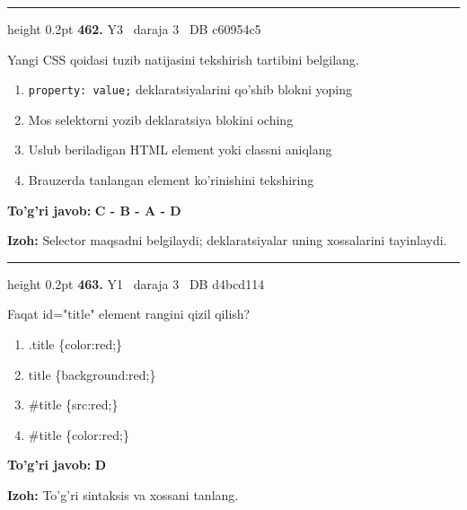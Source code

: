 \documentclass[10pt,a4paper,oneside]{article}
\begin{document}
\vspace{2mm}\hrule height 0.2pt \vspace{4mm}
\hypertarget{q462}{\textbf{\color{ink}462.}}  {\color{muted}\scriptsize Y3 \textbullet\ daraja 3 \textbullet\ DB c60954c5}
\par
Yangi CSS qoidasi tuzib natijasini tekshirish tartibini belgilang.
\begin{enumerate}[label=\Alph*),leftmargin=9mm]
\item \texttt{property: value;} deklaratsiyalarini qo'shib blokni yoping
\item Mos selektorni yozib deklaratsiya blokini oching
\item Uslub beriladigan HTML element yoki classni aniqlang
\item Brauzerda tanlangan element ko'rinishini tekshiring
\end{enumerate}
\begin{tcolorbox}[enhanced,breakable,colback=teal!4,colframe=teal!45!black,boxrule=0.45pt,arc=1.2mm,left=2.8mm,right=2.8mm,top=2mm,bottom=2mm,before skip=2mm,after skip=2mm]
\textbf{\color{teal}To'g'ri javob:} \textbf{C - B - A - D}
\par\smallskip
\textbf{Izoh:} Selector maqsadni belgilaydi; deklaratsiyalar uning xossalarini tayinlaydi.
\end{tcolorbox}
\vspace{2mm}\hrule height 0.2pt \vspace{4mm}
\hypertarget{q463}{\textbf{\color{ink}463.}}  {\color{muted}\scriptsize Y1 \textbullet\ daraja 3 \textbullet\ DB d4bcd114}
\par
Faqat id="title" element rangini qizil qilish?
\begin{enumerate}[label=\Alph*),leftmargin=9mm]
\item .title \{color:red;\}
\item title \{background:red;\}
\item \#title \{src:red;\}
\item \#title \{color:red;\}
\end{enumerate}
\begin{tcolorbox}[enhanced,breakable,colback=teal!4,colframe=teal!45!black,boxrule=0.45pt,arc=1.2mm,left=2.8mm,right=2.8mm,top=2mm,bottom=2mm,before skip=2mm,after skip=2mm]
\textbf{\color{teal}To'g'ri javob:} \textbf{D}
\par\smallskip
\textbf{Izoh:} To'g'ri sintaksis va xossani tanlang.
\end{tcolorbox}
\end{document}
